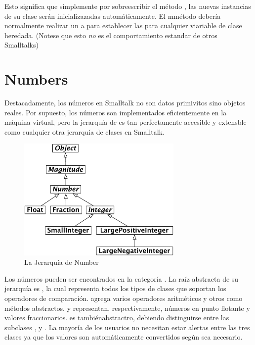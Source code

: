 \documentclass[a4paper,10pt,twoside]{book}
\begin{document}
Esto significa que simplemente por sobreescribir el m\'etodo , las nuevas instancias de su clase ser\'an inicializazadas autom\'aticamente. El mm\'etodo  deber\'ia normalmente realizar un  a  para establecer las  para cualquier viariable de clase heredada.
(Notese que esto \emph{no} es el comportamiento estandar de otros Smalltalks)


\section{Numbers}

Destacadamente, los n\'umeros en Smalltalk no son datos primivitos sino objetos reales. Por supuesto, los n\'umeros son implementados eficientemente en la m\'aquina virtual, pero la jerarqu\'ia de  es tan perfectamente accesible y extensble como cualquier otra jerarqu\'ia de clases en Smalltalk.

\begin{figure}[ht]
\centerline {\includegraphics[width=8cm]{NumberHierarchy}}
\caption{La Jerarqu\'ia de Number }
\end{figure}

Los n\'umeros pueden ser encontrados en la categor\'ia . 
La ra\'iz abstracta de su jerarqu\'ia es , la cual representa todos los tipos de clases que soportan los operadores de comparaci\'on.  agrega varios operadores aritm\'eticos y otros como m\'etodos abstractos.  y  representan, respectivamente, n\'umeros en punto flotante y valores fraccionarios.   es tambi\'enabstractro, debiendo distinguirse entre las subclases ,  y . La mayor\'ia de los usuarios no necesitan estar alertas entre las tres clases  ya que los valores son autom\'aticamente convertidos seg\'un sea necesario.
\end{document}
